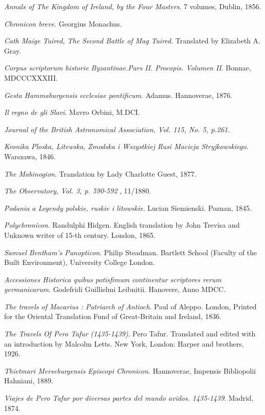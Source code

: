 \emph{Annals of The Kingdom of Ireland, by the Four Masters}. 7 volumes, Dublin, 1856.

\emph{Chronicon breve}. Georgius Monachus. 

\emph{Cath Maige Tuired, The Second Battle of Mag Tuired}. Translated by Elizabeth A. Gray.

\emph{Corpus scriptorum historie Byzantinae.Pars II. Procopis. Volumen II}. Bonnae, MDCCCXXXIII.

\emph{Gesta Hammaburgensis ecclesiae pontificum}. Adamus. Hannoverae, 1876. 

\emph{Il regno de gli Slavi}. Mavro Orbini, M.DCI.

\emph{Journal of the British Astronomical Association, Vol. 115, No. 5, p.261}.

\emph{Kronika Ploska, Litewska, Zmodska i Wszystkiej Rusi Macieja Stryjkowskiego}. Warszawa, 1846.


\emph{The Mabinogion}. Translation by Lady Charlotte Guest, 1877.

\emph{The Observatory, Vol. 3, p. 590-592 }, 11/1880.

\emph{Podania a Legendy polskie, ruskie i litowskie}. Lucian Siemienski. Poznan, 1845.

\emph{Polychronicon}. Randulphi Hidgen. English translation by John Trevisa and Unknown writer of 15-th century. London, 1865.

\emph{Samuel Bentham's Panopticon}. Philip Steadman. Bartlett School (Faculty of the Built Environment), University College London.

\emph{Accessiones Historica quibus potisfimum continentur scriptores rerum germanicarum}. Godefridi Guillielmi Leibnitii. Hanovere, Anno MDCC.

\emph{The travels of Macarius : Patriarch of Antioch}. Paul of Aleppo. London, Printed for the Oriental Translation Fund of Great-Britain and Ireland, 1836.

\emph{The Travels Of Pero Tafur (1435-1439)}. Pero Tafur. Translated and edited with an introduction by Malcolm Letts. New York, London: Harper and brothers, 1926.

\emph{Thietmari Merseburgensis
Episcopi Chronicon}. Hannoverae, Impensis Bibliopolii Hahniani, 1889.

\emph{Viajes de Pero Tafur por diversas partes del mundo avidos. 1435-1439}. Madrid, 1874.
